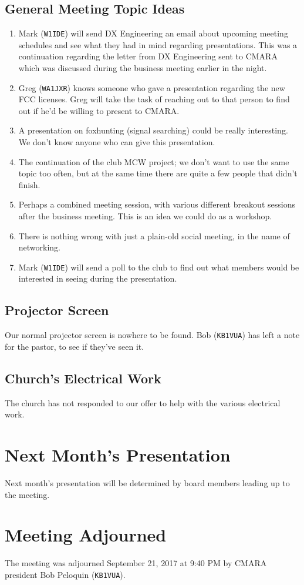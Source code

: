 \documentclass[10pt,letterpaper]{article}
\begin{document}
\subsection{General Meeting Topic Ideas}
\begin{enumerate}
  \item Mark (\texttt{W1IDE}) will send DX Engineering an email about upcoming meeting schedules and see what they had in mind regarding presentations. This was a continuation regarding the letter from DX Engineering sent to CMARA which was discussed during the business meeting earlier in the night.
  \item Greg (\texttt{WA1JXR}) knows someone who gave a presentation regarding the new FCC licenses. Greg will take the task of reaching out to that person to find out if he'd be willing to present to CMARA.
  \item A presentation on foxhunting (signal searching) could be really interesting. We don't know anyone who can give this presentation.
  \item The continuation of the club MCW project; we don't want to use the same topic too often, but at the same time there are quite a few people that didn't finish.
  \item Perhaps a combined meeting session, with various different breakout sessions after the business meeting. This is an idea we could do as a workshop.
  \item There is nothing wrong with just a plain-old social meeting, in the name of networking.
  \item Mark (\texttt{W1IDE}) will send a poll to the club to find out what members would be interested in seeing during the presentation.
\end{enumerate}

\subsection{Projector Screen}
Our normal projector screen is nowhere to be found. Bob (\texttt{KB1VUA}) has left a note for the pastor, to see if they've seen it.

\subsection{Church's Electrical Work}
The church has not responded to our offer to help with the various electrical work.

\section{Next Month's Presentation}
Next month's presentation will be determined by board members leading up to the meeting.

\section{Meeting Adjourned}
The meeting was adjourned September 21, 2017 at 9:40 PM by CMARA president Bob Peloquin (\texttt{KB1VUA}).
\end{document}
